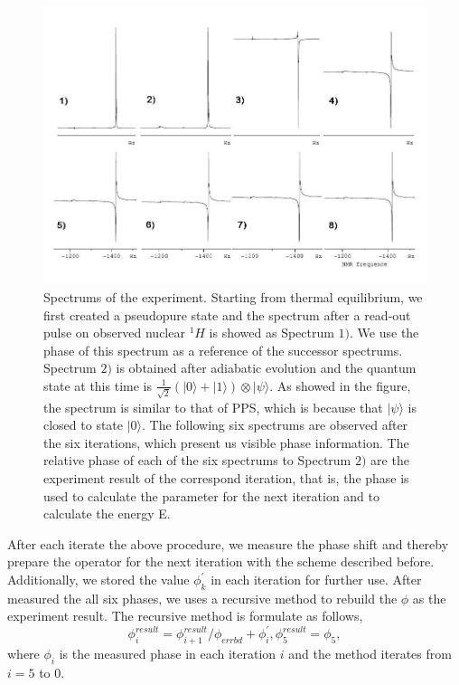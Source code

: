 \def\CTeXPreproc{Created by ctex v0.2.12, don't edit!}\documentclass[twocolumn,showpacs,twoside,10pt,superscriptaddress,prl]{revtex4}
\begin{document}
\begin{figure}[htb]
\begin{center}
\includegraphics[width=0.99\columnwidth]{newspectrum}
\end{center}
\caption{Spectrums of the experiment. Starting from thermal
equilibrium, we first created a pseudopure state and the spectrum
after a read-out pulse on observed nuclear $^{1}H$ is showed as
Spectrum $1)$. We use the phase of this spectrum as a reference of
the successor spectrums. Spectrum $2)$ is obtained after adiabatic
evolution and the quantum state at this time is
$\frac{1}{\sqrt{2}}(|0\rangle+|1\rangle)\otimes|\psi\rangle$. As
showed in the figure, the spectrum is similar to that of PPS, which
is because that $|\psi\rangle$ is closed to state $|0\rangle$. The
following six spectrums are observed after the six iterations, which
present us visible phase information. The relative phase of each of
the six spectrums to Spectrum $2)$ are the experiment result of the
correspond iteration, that is, the phase is used to calculate the
parameter for the next iteration and to calculate the energy E.}
\label{newspectrum}
\end{figure}




After each iterate the above procedure, we measure the phase shift
and thereby prepare the operator for the next iteration with the
scheme described before. Additionally, we stored the value
$\phi^{'}_k$ in each iteration for further use. After measured the
all six phases, we uses a recursive method to rebuild the $\phi$ as
the experiment result. The recursive method is formulate as follows,
$$
\phi^{result}_i=\phi^{result}_{i+1} / \phi_{errbd} + \phi^{'}_i,
\phi^{result}_5 = \phi_5,
$$
where $\phi_i$ is the measured phase in each iteration $i$ and the
method iterates from $i=5$ to $0$.
\end{document}
